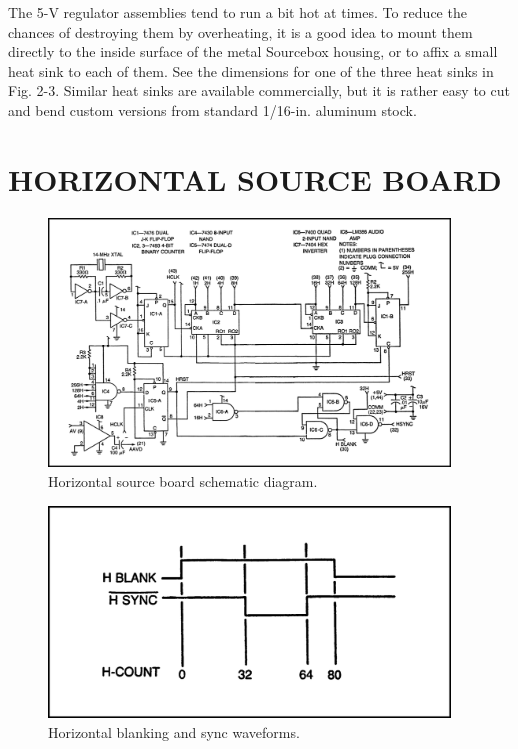 \documentclass[11pt]{book}              %
\begin{document}
The 5-V regulator assemblies tend to run a bit hot at times. To reduce the chances of destroying them by overheating, it is a good idea to mount them directly to the inside surface of the metal Sourcebox housing, or to affix a small heat sink to each of them. See the dimensions for one of the three heat sinks in Fig. 2-3. Similar heat sinks are available commercially, but it is rather easy to cut and bend custom versions from standard 1/16-in. aluminum stock.


\section{HORIZONTAL SOURCE BOARD}

\begin{figure}
    \centering
    \includegraphics[width=0.95\textwidth]{images/fig2-4}
    \caption{Horizontal source board schematic diagram.}
\end{figure}

\begin{figure}
    \centering
    \includegraphics[width=0.95\textwidth]{images/fig2-5}
    \caption{Horizontal blanking and sync waveforms.}
\end{figure}
\end{document}
